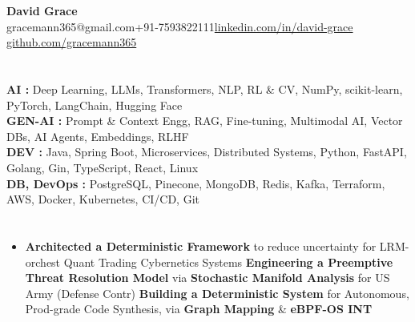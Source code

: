 \documentclass[11pt]{article}
\begin{document}
\begin{center}
  {\LARGE \bf{David Grace}}\\[1ex]
  {\large gracemann365@gmail.com\quad \quad +91-7593822111\quad \quad \href{https://linkedin.com/in/david-grace}{linkedin.com/in/david-grace}} \quad \quad
 \href{https://github.com/gracemann365}{github.com/gracemann365} 
\end{center}

\section*{}
\noindent
\textbf{AI : } Deep Learning, LLMs, Transformers, NLP, RL \& CV, NumPy, scikit-learn, PyTorch, LangChain, Hugging Face \\[0.3ex]
\textbf{GEN-AI : } Prompt \& Context Engg, RAG, Fine-tuning, Multimodal AI, Vector DBs, AI Agents, Embeddings, RLHF\\[0.3ex]
\textbf{DEV : } Java, Spring Boot, Microservices, Distributed Systems, Python, FastAPI, Golang, Gin, TypeScript, React, Linux\\[0.3ex]
\textbf{DB, DevOps : } PostgreSQL, Pinecone, MongoDB, Redis, Kafka, Terraform, AWS, Docker, Kubernetes, CI/CD, Git

\section*{}
\vspace{0.5em}
\subsection*{}
\begin{itemize}[itemsep=0.2ex,leftmargin=*,topsep=0pt]
  \item \textbf{Architected a Deterministic Framework} to reduce uncertainty for LRM-orchest Quant Trading Cybernetics Systems  
  \textbf{Engineering a Preemptive Threat Resolution Model} via \textbf{Stochastic Manifold Analysis} for US Army (Defense Contr)
  \textbf{Building a Deterministic System} for Autonomous, Prod-grade Code Synthesis, via \textbf{Graph Mapping} \& \textbf{eBPF-OS INT}
\end{itemize}
\vspace{0.1em}
\end{document}
